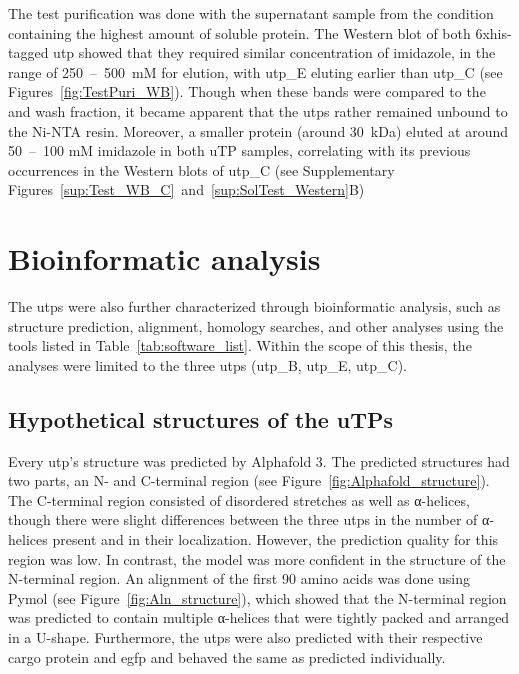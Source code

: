 The test purification was done with the supernatant sample from the condition containing the highest amount of soluble protein. The Western blot of both \gls{6xhis}-tagged \gls{utp} showed that they required similar concentration of imidazole, in the range of 250~--~500~mM for elution, with \gls{utp_E} eluting earlier than \gls{utp_C} (see Figures~\ref{fig:TestPuri_WB}). Though when these bands were compared to the  and wash fraction, it became apparent that the \gls{utp}s rather remained unbound to the \gls{Ni-NTA} resin. Moreover, a smaller protein (around 30~kDa) eluted at around 50~--~100 mM imidazole in both uTP samples, correlating with its previous occurrences in the Western blots of \gls{utp_C} (see Supplementary Figures~\ref{sup:Test_WB_C}~and~\ref{sup:SolTest_Western}B) 


\section{Bioinformatic analysis}
The \gls{utp}s were also further characterized through bioinformatic analysis, such as structure prediction, alignment, homology searches, and other analyses using the tools listed in Table~\ref{tab:software_list}. Within the scope of this thesis, the analyses were limited to the three \gls{utp}s (\gls{utp_B}, \gls{utp_E}, \gls{utp_C}). 
\subsection{Hypothetical structures of the uTPs}
Every  \gls{utp}'s structure was predicted by Alphafold 3. The predicted structures had two parts, an N- and C-terminal region (see Figure~\ref{fig:Alphafold_structure}). The C-terminal region consisted of disordered stretches as well as α-helices, though there were slight differences between the three \gls{utp}s in the number of α-helices present and in their localization. However, the prediction quality for this region was low. In contrast, the model was more confident in the structure of the N-terminal region. An alignment of the first 90 amino acids was done using Pymol (see Figure~\ref{fig:Aln_structure}), which showed that the N-terminal region was predicted to contain multiple α-helices that were tightly packed and arranged in a U-shape. Furthermore, the \gls{utp}s were also predicted with their respective cargo protein and \gls{egfp} and behaved the same as predicted individually. 

